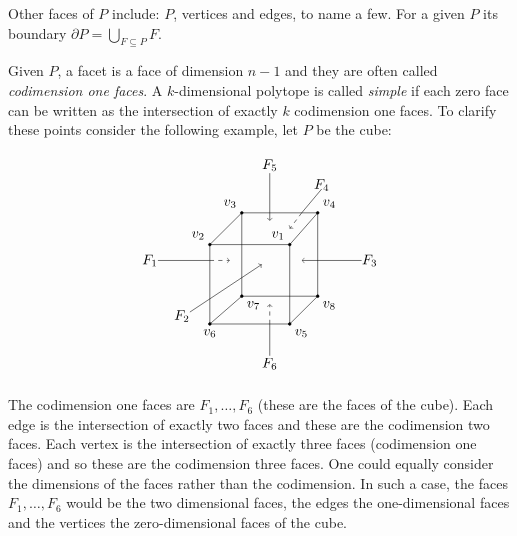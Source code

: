 \documentclass[oneside,12pt]{amsart}
\theoremstyle{definition}
\numberwithin{equation}{section}
\begin{document}
Other faces of $P$ include:  $P$, vertices and edges, to name a few.  For a given $P$ its boundary $\partial P = \bigcup_{F \subseteq P} F$.

Given $P$, a facet is a face of dimension $n-1$ and they are often called \textit{codimension one faces}. A $k$-dimensional polytope is called \textit{simple} if each zero face can be written as the intersection of exactly $k$ codimension one faces.  To clarify these points consider the following example, let $P$ be the cube:\\

\begin{minipage}{\linewidth}%
$$
\begin{tikzpicture}
\draw (0,0)--(2,0)--(2,2)--(0,2)--(0,0);
\draw (.8,.7)--(2.7,.7)--(2.7,2.8)--(.8,2.8)--(.8,.7);
\draw (.8,.7)--(0,0);
\draw (2,0)--(2.7,.7);
\draw (2,2)--(2.7,2.8);
\draw (0,2)--(.8,2.8);
\filldraw[black] (0,0) node[below=.1pt]{$v_6$} circle (1pt);
\filldraw[black] (.8,.7) node[below right=.1pt]{$v_7$} circle (1pt);
\filldraw[black] (2,0) node[below right=.1pt]{$v_5$} circle (1pt);
\filldraw[black] (2.7,.7) node[below right=.1pt]{$v_8$}circle (1pt);
\filldraw[black] (2,2) node[above left=.1pt]{$v_1$}circle (1pt);
\filldraw[black] (0,2) node[above left=.1pt]{$v_2$} circle (1pt);
\filldraw[black] (2.7,2.8) node[above right=.1pt]{$v_4$} circle (1pt);
\filldraw[black] (.8,2.8) node[above left=.1pt]{$v_3$}circle (1pt);
\draw (1.5,4)node{$F_{5}$};
\draw[->](1.5,3.8)--(1.5,2.6);
\draw (4,1.6)node{$F_{3}$};
\draw[->](3.8,1.6)--(2.3,1.6);
\draw (-.7,.2)node{$F_{2}$};
\draw[->](-.5,.3)--(1.3,1.5);
\draw (-1.5,1.6)node{$F_{1}$};
\draw[-](-1.3,1.6)--(0,1.6);
\draw[dashed,->](0,1.6)--(.5,1.6);
\draw (1.5,-1)node{$F_{6}$};
\draw[-](1.5,-.8)--(1.5,0);
\draw[dashed,->](1.5,0)--(1.5,.5);
\draw (2.8,3.5)node{$F_{4}$};
\draw[-](2.8,3.4)--(2.3,2.8);
\draw[dashed,->](2.3,2.8)--(2,2.4);
\end{tikzpicture}$$
        \end{minipage}

The codimension one faces are $F_1,\ldots,F_6$ (these are the faces of the cube).  Each edge is the intersection of exactly two faces and these are the codimension two faces.  Each vertex is the intersection of exactly three faces (codimension one faces) and so these are the codimension three faces.  One could equally consider the dimensions of the faces rather than the codimension. In such a case, the faces $F_1,\ldots,F_6$ would be the two dimensional faces, the edges the one-dimensional faces and the vertices the zero-dimensional faces of the cube.
\end{document}
